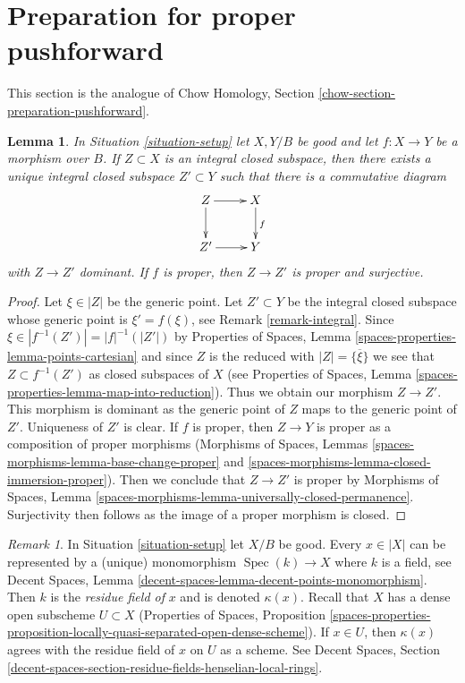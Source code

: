 \documentclass{stacks-project}
\theoremstyle{plain}
\newtheorem{lemma}[subsection]{Lemma}
\theoremstyle{definition}
\theoremstyle{remark}
\newtheorem{remark}[subsection]{Remark}
\numberwithin{equation}{subsection}
\def\Spec{\mathop{\mathrm{Spec}}}
\begin{document}
\section{Preparation for proper pushforward}
\label{section-preparation-pushforward}

\noindent
This section is the analogue of
Chow Homology, Section \ref{chow-section-preparation-pushforward}.

\begin{lemma}
\label{lemma-proper-image}
In Situation \ref{situation-setup} let $X,Y/B$ be good and let $f : X \to Y$
be a morphism over $B$. If $Z \subset X$ is an integral closed subspace, then
there exists a unique integral closed subspace $Z' \subset Y$ such that there
is a commutative diagram
$$
\xymatrix{
Z \ar[r] \ar[d] & X \ar[d]^f \\
Z' \ar[r] & Y
}
$$
with $Z \to Z'$ dominant. If $f$ is proper, then $Z \to Z'$ is proper
and surjective.
\end{lemma}

\begin{proof}
Let $\xi \in |Z|$ be the generic point. Let $Z' \subset Y$ be the integral
closed subspace whose generic point is $\xi' = f(\xi)$, see
Remark \ref{remark-integral}. Since $\xi \in |f^{-1}(Z')| = |f|^{-1}(|Z'|)$
by Properties of Spaces, Lemma \ref{spaces-properties-lemma-points-cartesian}
and since $Z$ is the reduced with $|Z| = \overline{\{\xi\}}$
we see that $Z \subset f^{-1}(Z')$ as closed subspaces of $X$ (see
Properties of Spaces, Lemma \ref{spaces-properties-lemma-map-into-reduction}).
Thus we obtain our morphism $Z \to Z'$.
This morphism is dominant as the generic point of $Z$
maps to the generic point of $Z'$. Uniqueness of $Z'$ is clear.
If $f$ is proper, then $Z \to Y$ is proper as a composition
of proper morphisms (Morphisms of Spaces, Lemmas
\ref{spaces-morphisms-lemma-base-change-proper} and
\ref{spaces-morphisms-lemma-closed-immersion-proper}).
Then we conclude that $Z \to Z'$ is proper by
Morphisms of Spaces, Lemma
\ref{spaces-morphisms-lemma-universally-closed-permanence}.
Surjectivity then follows as the image of a proper morphism is closed.
\end{proof}

\begin{remark}
\label{remark-residue-field}
In Situation \ref{situation-setup} let $X/B$ be good. Every $x \in |X|$
can be represented by a (unique) monomorphism $\Spec(k) \to X$ where
$k$ is a field, see
Decent Spaces, Lemma \ref{decent-spaces-lemma-decent-points-monomorphism}.
Then $k$ is the {\it residue field of} $x$ and is denoted $\kappa(x)$.
Recall that $X$ has a dense open subscheme $U \subset X$
(Properties of Spaces, Proposition
\ref{spaces-properties-proposition-locally-quasi-separated-open-dense-scheme}).
If $x \in U$, then $\kappa(x)$ agrees with the residue
field of $x$ on $U$ as a scheme. See Decent Spaces, Section
\ref{decent-spaces-section-residue-fields-henselian-local-rings}.
\end{remark}
\end{document}

